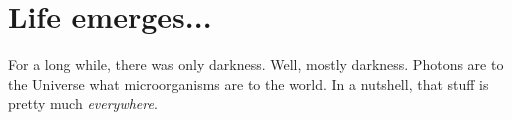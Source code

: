 \documentclass[main.tex]{subfiles}
\begin{document}
%



\chapter{Life emerges...}

\par \nar For a long while, there was only darkness.  Well, mostly darkness.  Photons are to the Universe what microorganisms are to the world.  In a nutshell, that stuff is pretty much \textit{everywhere}.

\end{document}
